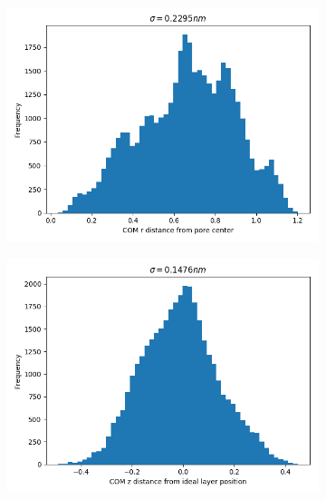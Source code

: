\documentclass{article}
\begin{document}
  \begin{figure}[!htb]
  \centering
  \begin{subfigure}{0.45\textwidth}
  \includegraphics[width=\textwidth]{xy_com_distribution.png}
  \caption{}\label{fig:xy_com_distribution}
  \end{subfigure}
  \begin{subfigure}{0.45\textwidth}
  \includegraphics[width=\textwidth]{z_com_distribution.png}
  \caption{}\label{fig:z_com_distribution}
  \end{subfigure}
  \caption{}\label{fig:com_distribution}
  \end{figure}
\end{document}
